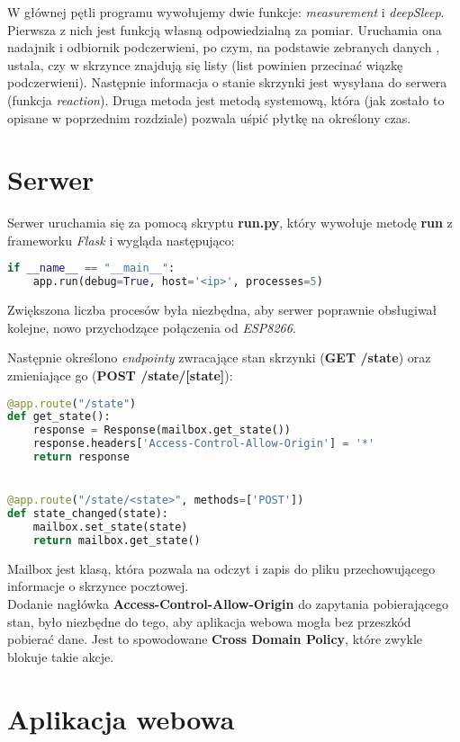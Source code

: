 W głównej pętli programu wywołujemy dwie funkcje: \emph{measurement} i \emph{deepSleep}. Pierwsza z nich jest funkcją własną odpowiedzialną za pomiar. Uruchamia ona nadajnik i odbiornik podczerwieni, po czym, na podstawie zebranych danych , ustala, czy w skrzynce znajdują się listy (list powinien przecinać wiązkę podczerwieni). Następnie informacja o stanie skrzynki jest wysyłana do serwera (funkcja \emph{reaction}). Druga metoda jest metodą systemową, która (jak zostało to opisane w poprzednim rozdziale) pozwala uśpić płytkę na określony czas.

\section{Serwer}

Serwer uruchamia się za pomocą skryptu \textbf{run.py}, który wywołuje metodę \textbf{run} z frameworku \textit{Flask} i wygląda następująco:

\begin{lstlisting}[language=Python]
if __name__ == "__main__":
    app.run(debug=True, host='<ip>', processes=5)
\end{lstlisting}

Zwiększona liczba procesów była niezbędna, aby serwer poprawnie obsługiwał kolejne, nowo przychodzące połączenia od \textit{ESP8266}.

Następnie określono \textit{endpointy} zwracające stan skrzynki (\textbf{GET /state}) oraz zmieniające go (\textbf{POST /state/[state]}):

\begin{lstlisting}[language=Python]
@app.route("/state")
def get_state():
    response = Response(mailbox.get_state())
    response.headers['Access-Control-Allow-Origin'] = '*'
    return response


@app.route("/state/<state>", methods=['POST'])
def state_changed(state):
    mailbox.set_state(state)
    return mailbox.get_state()
\end{lstlisting}

Mailbox jest klasą, która pozwala na odczyt i zapis do pliku przechowującego informacje o skrzynce pocztowej. \\

Dodanie nagłówka \textbf{Access-Control-Allow-Origin} do zapytania pobierającego stan, było niezbędne do tego, aby aplikacja webowa mogła bez przeszkód pobierać dane. Jest to spowodowane \textbf{Cross Domain Policy}, które zwykle blokuje takie akcje.

\section{Aplikacja webowa}

